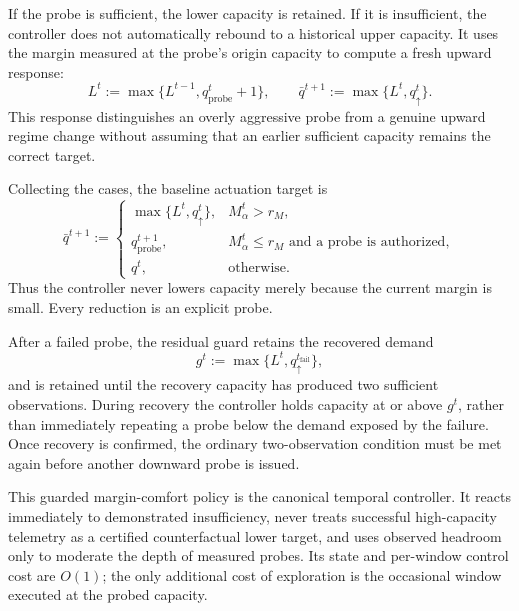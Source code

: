 \documentclass[sigconf, nonacm]{acmart}
\begin{document}
If the probe is sufficient, the lower capacity is retained. If it is insufficient, the controller does not automatically rebound to a historical upper capacity. It uses the margin measured at the probe's origin capacity to compute a fresh upward response:
\begin{equation}
\label{eq:probe-insufficient}
L^t
:=
\max\{L^{t-1},q_{\mathrm{probe}}^t+1\},
\qquad
\bar q^{t+1}
:=
\max\{L^t,q_\uparrow^t\}.
\end{equation}
This response distinguishes an overly aggressive probe from a genuine upward regime change without assuming that an earlier sufficient capacity remains the correct target.

Collecting the cases, the baseline actuation target is
\begin{equation}
\label{eq:baseline-actuation}
\bar q^{t+1}
:=
\begin{cases}
\max\{L^t,q_\uparrow^t\},
& M_\alpha^t>r_M,\\[0.5ex]
q_{\mathrm{probe}}^{t+1},
& M_\alpha^t\le r_M
\text{ and a probe is authorized},\\[0.5ex]
q^t,
& \text{otherwise}.
\end{cases}
\end{equation}
Thus the controller never lowers capacity merely because the current margin is small. Every reduction is an explicit probe.

After a failed probe, the residual guard retains the recovered demand
\begin{equation}
\label{eq:guarded-probe-demand}
g^t
:=
\max\{L^t,q_\uparrow^{t_{\mathrm{fail}}}\}
,
\end{equation}
and is retained until the recovery capacity has produced two sufficient observations. During recovery the controller holds capacity at or above \(g^t\), rather than immediately repeating a probe below the demand exposed by the failure. Once recovery is confirmed, the ordinary two-observation condition must be met again before another downward probe is issued.

This guarded margin-comfort policy is the canonical temporal controller. It reacts immediately to demonstrated insufficiency, never treats successful high-capacity telemetry as a certified counterfactual lower target, and uses observed headroom only to moderate the depth of measured probes. Its state and per-window control cost are \(O(1)\); the only additional cost of exploration is the occasional window executed at the probed capacity.
\end{document}
